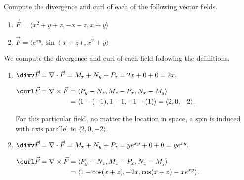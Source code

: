 {Compute the divergence and curl of each of the following vector fields.
\begin{enumerate}
	\item $\vec F = \langle x^2+y+z, -x-z, x+y\rangle$
	\item	$\vec F = \langle e^{xy}, \sin(x+z),x^2+y\rangle$
\end{enumerate}
}
{We compute the divergence and curl of each field following the definitions.
\begin{enumerate}
	\item $\divv \vec F = \nabla \cdot \vec F = M_x+N_y+P_z = 2x+0+0= 2x.$
	
	$\begin{aligned}\curl\vec F = \nabla \times \vec F &= \langle P_y-N_z,M_z-P_x,N_x - M_y\rangle\\ &= \langle 1 - (-1), 1-1,-1-(1)\rangle = \langle 2,0,-2\rangle.
	\end{aligned}$
	
	For this particular field, no matter the location in space, a spin is induced with axis parallel to $\langle 2,0,-2\rangle.$
	\item $\divv \vec F = \nabla \cdot \vec F = M_x+N_y+P_z = ye^{xy}+0+0= ye^{xy}.$
		
	$\begin{aligned}\curl\vec F = \nabla \times \vec F &= \langle P_y-N_z,M_z-P_x,N_x - M_y\rangle\\ &= \langle 1-\cos(x+z), -2x, \cos(x+z) - xe^{xy}\rangle. \end{aligned}$
\end{enumerate}
\baselineskip
}
\\

